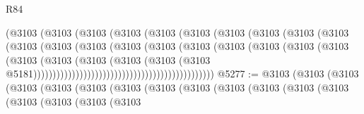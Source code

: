 \begin{lexlean}{R84}
\begin{coremodule}
                                              (@3103
                                                (@3103
                                                  (@3103
                                                    (@3103
                                                      (@3103
                                                        (@3103
                                                          (@3103
                                                            (@3103
                                                              (@3103
                                                                (@3103
                                                                  (@3103
                                                                    (@3103
                                                                      (@3103
                                                                        (@3103
                                                                          (@3103
                                                                            (@3103
                                                                              (@3103
                                                                                (@3103
                                                                                  (@3103
                                                                                    (@3103
                                                                                      (@3103
                                                                                        (@3103
                                                                                          (@3103
                                                                                            (@3103
                                                                                              (@3103
                                                                                                (@3103
                                                                                                  @5181)))))))))))))))))))))))))))))))))))))))))))))))
@5277 := @3103
    (@3103
      (@3103
        (@3103
          (@3103
            (@3103
              (@3103
                (@3103
                  (@3103
                    (@3103
                      (@3103
                        (@3103
                          (@3103
                            (@3103
                              (@3103
                                (@3103
                                  (@3103

\end{coremodule}
\end{lexlean}
